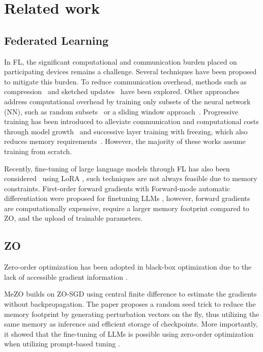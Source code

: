 \section{Related work}
\subsection{Federated Learning}
In FL, the significant computational and communication burden placed on participating devices remains a challenge. Several techniques have been proposed to mitigate this burden. To reduce communication overhead, methods such as compression~\cite{thakker2019compressing} and sketched updates~\cite{shi2020communication} have been explored. Other approaches address computational overhead by training only subsets of the neural network (NN), such as random subsets~\cite{caldas2018expanding} or a sliding window approach~\cite{alam2022fedrolex}. Progressive training has been introduced to alleviate communication and computational costs through model growth~\cite{wang2022progfed} and successive layer training with freezing, which also reduces memory requirements~\cite{pfeiffer2023successive}. However, the majority of these works assume training from scratch. 

Recently, fine-tuning of large language models through FL has also been considered~\cite{babakniya2023slora} using LoRA \cite{hu2022lora}, such techniques are not always feasible due to memory constraints. First-order forward gradients \cite{baydin2022gradients} with Forward-mode automatic differentiation were proposed for finetuning LLMs \cite{spry_cite, FwdLLM}, however, forward gradients are computationally expensive, require a larger memory footprint compared to \ac{ZO}, and the upload of trainable parameters.  



\subsection{\acl{ZO}}

Zero-order optimization has been adopted in black-box optimization due to the lack of accessible gradient information \cite{blackbox_1, blackbox_2}.

MeZO \cite{malladi2023fine} builds on ZO-SGD \cite{spsa_cite} using central finite difference to estimate the gradients without backpropagation. The paper proposes a random seed trick to reduce the memory footprint by generating perturbation vectors on the fly, thus utilizing the same memory as inference and efficient storage of checkpoints. More importantly, it showed that the fine-tuning of LLMs is possible using zero-order optimization when utilizing prompt-based tuning \cite{gao-etal-2021-making}.

